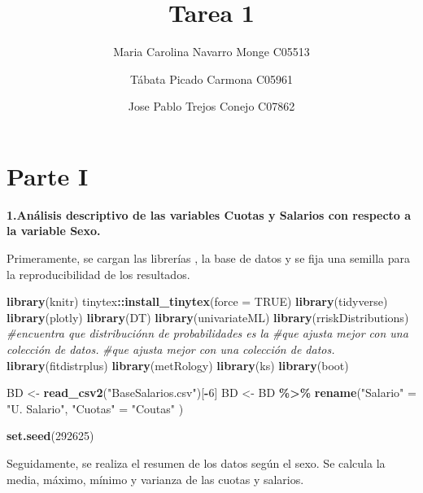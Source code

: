 \documentclass[
]{article}
\title{Tarea 1}
\author{Maria Carolina Navarro Monge C05513 \and Tábata Picado Carmona
C05961 \and Jose Pablo Trejos Conejo C07862}
\date{}
\newenvironment{Shaded}{\begin{snugshade}}{\end{snugshade}}
\newcommand{\AttributeTok}[1]{\textcolor[rgb]{0.13,0.29,0.53}{#1}}
\newcommand{\CommentTok}[1]{\textcolor[rgb]{0.56,0.35,0.01}{\textit{#1}}}
\newcommand{\ConstantTok}[1]{\textcolor[rgb]{0.56,0.35,0.01}{#1}}
\newcommand{\DecValTok}[1]{\textcolor[rgb]{0.00,0.00,0.81}{#1}}
\newcommand{\FunctionTok}[1]{\textcolor[rgb]{0.13,0.29,0.53}{\textbf{#1}}}
\newcommand{\NormalTok}[1]{#1}
\newcommand{\OtherTok}[1]{\textcolor[rgb]{0.56,0.35,0.01}{#1}}
\newcommand{\SpecialCharTok}[1]{\textcolor[rgb]{0.81,0.36,0.00}{\textbf{#1}}}
\newcommand{\StringTok}[1]{\textcolor[rgb]{0.31,0.60,0.02}{#1}}
\begin{document}
\maketitle

\hypertarget{parte-i}{%
\section{Parte I}\label{parte-i}}

\textbf{1.Análisis descriptivo de las variables Cuotas y Salarios con
respecto a la variable Sexo.}

Primeramente, se cargan las librerías , la base de datos y se fija una
semilla para la reproducibilidad de los resultados.

\begin{Shaded}
\begin{Highlighting}[]
\FunctionTok{library}\NormalTok{(knitr)}
\NormalTok{tinytex}\SpecialCharTok{::}\FunctionTok{install\_tinytex}\NormalTok{(}\AttributeTok{force =} \ConstantTok{TRUE}\NormalTok{)}
\FunctionTok{library}\NormalTok{(tidyverse)}
\FunctionTok{library}\NormalTok{(plotly)}
\FunctionTok{library}\NormalTok{(DT)}
\FunctionTok{library}\NormalTok{(univariateML)}
\FunctionTok{library}\NormalTok{(rriskDistributions) }\CommentTok{\#encuentra que distribuciónn de probabilidades es la}
                            \CommentTok{\#que ajusta mejor con una colección de datos.}
                            \CommentTok{\#que ajusta mejor con una colección de datos.}
\FunctionTok{library}\NormalTok{(fitdistrplus)}
\FunctionTok{library}\NormalTok{(metRology)}
\FunctionTok{library}\NormalTok{(ks)}
\FunctionTok{library}\NormalTok{(boot)}

\NormalTok{BD }\OtherTok{\textless{}{-}} \FunctionTok{read\_csv2}\NormalTok{(}\StringTok{"BaseSalarios.csv"}\NormalTok{)[}\SpecialCharTok{{-}}\DecValTok{6}\NormalTok{]}
\NormalTok{BD }\OtherTok{\textless{}{-}}\NormalTok{ BD }\SpecialCharTok{\%\textgreater{}\%} \FunctionTok{rename}\NormalTok{(}\StringTok{"Salario"} \OtherTok{=} \StringTok{"U. Salario"}\NormalTok{, }\StringTok{"Cuotas"} \OtherTok{=} \StringTok{"Coutas"}\NormalTok{ )}

\FunctionTok{set.seed}\NormalTok{(}\DecValTok{292625}\NormalTok{)}
\end{Highlighting}
\end{Shaded}

Seguidamente, se realiza el resumen de los datos según el sexo. Se
calcula la media, máximo, mínimo y varianza de las cuotas y salarios.
\end{document}
